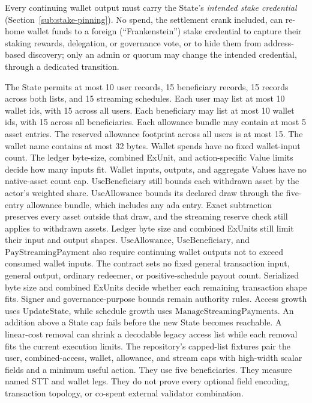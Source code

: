 \documentclass[11pt,DIV=11,parskip=half-]{scrartcl}
\begin{document}
\begin{description}[leftmargin=1.4em,style=nextline]
\item[Stake-credential pinning.] Every continuing wallet output must carry the State's \emph{intended stake credential} (Section~\ref{sub:stake-pinning}). No spend, the settlement crank included, can re-home wallet funds to a foreign (``Frankenstein'') stake credential to capture their staking rewards, delegation, or governance vote, or to hide them from address-based discovery; only an admin or quorum may change the intended credential, through a dedicated transition.
\item[Bounded execution cost.] The State permits at most 10 user records, 15 beneficiary records, 15 records across both lists, and 15 streaming schedules. Each user may list at most 10 wallet ids, with 15 across all users. Each beneficiary may list at most 10 wallet ids, with 15 across all beneficiaries. Each allowance bundle may contain at most 5 asset entries. The reserved allowance footprint across all users is at most 15. The wallet name contains at most 32 bytes. Wallet spends have no fixed wallet-input count. The ledger byte-size, combined ExUnit, and action-specific Value limits decide how many inputs fit. Wallet inputs, outputs, and aggregate Values have no native-asset count cap. $\mathrm{UseBeneficiary}$ still bounds each withdrawn asset by the actor's weighted share. $\mathrm{UseAllowance}$ bounds its declared draw through the five-entry allowance bundle, which includes any ada entry. Exact subtraction preserves every asset outside that draw, and the streaming reserve check still applies to withdrawn assets. Ledger byte size and combined ExUnits still limit their input and output shapes. $\mathrm{UseAllowance}$, $\mathrm{UseBeneficiary}$, and $\mathrm{PayStreamingPayment}$ also require continuing wallet outputs not to exceed consumed wallet inputs. The contract sets no fixed general transaction input, general output, ordinary redeemer, or positive-schedule payout count. Serialized byte size and combined ExUnits decide whether each remaining transaction shape fits. Signer and governance-purpose bounds remain authority rules. Access growth uses $\mathrm{UpdateState}$, while schedule growth uses $\mathrm{ManageStreamingPayments}$. An addition above a State cap fails before the new State becomes reachable. A linear-cost removal can shrink a decodable legacy access list while each removal fits the current execution limits. The repository's capped-list fixtures pair the user, combined-access, wallet, allowance, and stream caps with high-width scalar fields and a minimum useful action. They use five beneficiaries. They measure named STT and wallet legs. They do not prove every optional field encoding, transaction topology, or co-spent external validator combination.
\end{description}
\end{document}
